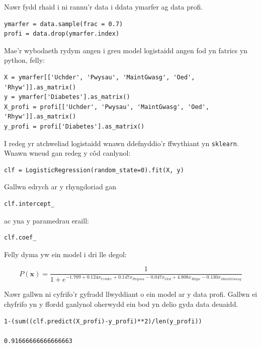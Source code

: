 Nawr fydd rhaid i ni rannu'r data i ddata ymarfer ag data profi.

\begin{verbatim}
ymarfer = data.sample(frac = 0.7)
profi = data.drop(ymarfer.index)
\end{verbatim}

Mae'r wybodaeth rydym angen i greu model logistaidd angen fod yn fatrics yn python, felly:

\begin{verbatim}
X = ymarfer[['Uchder', 'Pwysau', 'MaintGwasg', 'Oed', 'Rhyw']].as_matrix()
y = ymarfer['Diabetes'].as_matrix()
X_profi = profi[['Uchder', 'Pwysau', 'MaintGwasg', 'Oed', 'Rhyw']].as_matrix()
y_profi = profi['Diabetes'].as_matrix()
\end{verbatim}

I redeg yr atchweliad logistaidd wnawn ddefnyddio'r ffwythiant yn \texttt{sklearn}. Wnawn wneud gan redeg y c\^{o}d canlynol:

\begin{verbatim}
clf = LogisticRegression(random_state=0).fit(X, y)
\end{verbatim}

Gallwn edrych ar y rhyngdoriad gan

\begin{verbatim}
clf.intercept_
\end{verbatim}



ac yna y paramedrau eraill:

\begin{verbatim}
clf.coef_
\end{verbatim}



Felly dyma yw ein model i dri lle degol:

$$ P(\mathbf{x}) = \frac{1}{1 + e^{-1.709 + 0.124 x_{Uchder} + 0.147 x_{Pwysau} - 0.047 x_{Oed} + 4.808 x_{Rhyw} - 0.130 x_{MaintGwasg}}} $$

Nawr gallwn ni cyfrifo'r gyfradd llwyddiant o ein model ar y data profi. Gallwn ei chyfrifo yn y ffordd ganlynol oherwydd ein bod yn delio gyda data deuaidd.

\begin{verbatim}
1-(sum((clf.predict(X_profi)-y_profi)**2)/len(y_profi))

0.91666666666666663
\end{verbatim}

